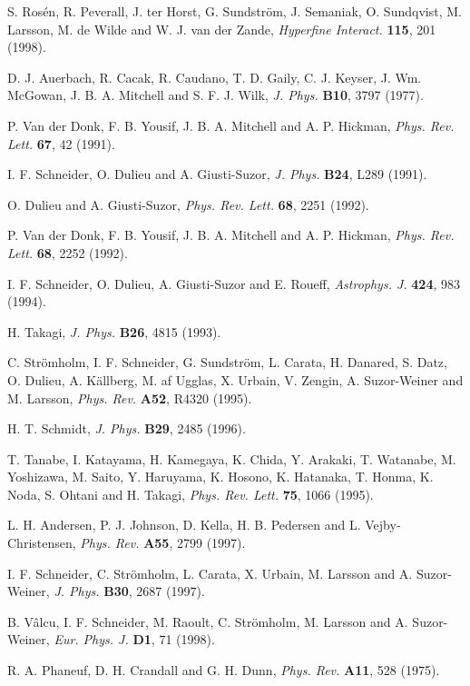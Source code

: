 \documentclass{ws-rv9x6}
\begin{document}
\begin{thebibliography}{000}
S. Ros\'en, R. Peverall, J. ter Horst,
G. Sundstr\"om, J. Semaniak, O. Sundqvist, M. Larsson, M. de Wilde and W. J. van der Zande, {\it
Hyperfine Interact.} {\bf 115}, 201 (1998).

D. J. Auerbach, R. Cacak, R. Caudano, T. D. Gaily, C. J. Keyser,
J. Wm. McGowan, J. B. A. Mitchell and S. F. J.  Wilk, {\it J. Phys.}
{\bf B10}, 3797 (1977).

P. Van der Donk, F. B. Yousif, J. B. A. Mitchell and A. P. Hickman,
{\it Phys. Rev. Lett.} {\bf 67}, 42 (1991).

I. F. Schneider, O. Dulieu and A. Giusti-Suzor, {\it J. Phys.} 
{\bf B24}, L289 (1991).

O. Dulieu and A. Giusti-Suzor, {\it Phys. Rev. Lett.}
{\bf 68}, 2251 (1992).

P. Van der Donk, F. B. Yousif, J. B. A. Mitchell and A. P. Hickman,
{\it Phys. Rev. Lett.} {\bf 68}, 2252 (1992).

I. F. Schneider, O. Dulieu, A. Giusti-Suzor and E. Roueff, {\it
Astrophys. J.} {\bf 424}, 983 (1994).

H. Takagi, {\it J. Phys.} {\bf B26}, 4815 (1993).

C. Str\"omholm, I. F. Schneider, G. Sundstr\"om, L. Carata,
H. Danared, S. Datz, O. Dulieu, A. K\"allberg, M. af Ugglas, X. Urbain, V.
Zengin, A. Suzor-Weiner and M. Larsson, {\it Phys. Rev.} {\bf A52}, R4320
(1995).

H. T. Schmidt, {\it J. Phys.} {\bf B29}, 2485 (1996).

T. Tanabe, I. Katayama, H. Kamegaya, K. Chida, Y. Arakaki,
T. Watanabe, M. Yoshizawa, M. Saito, Y. Haruyama, K. Hosono,
K. Hatanaka, T. Honma, K. Noda, S. Ohtani and H. Takagi, {\it
Phys. Rev. Lett.} {\bf 75}, 1066 (1995).

L. H. Andersen, P. J. Johnson, D. Kella, H. B. Pedersen and
L. Vejby-Christensen, {\it Phys. Rev.} {\bf A55}, 2799 (1997).

I. F. Schneider, C. Str\"omholm, L. Carata, X. Urbain, M. Larsson
and A. Suzor-Weiner, {\it J. Phys.} {\bf B30}, 2687 (1997).  

B. V\^{a}lcu, I. F. Schneider, M. Raoult, C.  Str\"omholm, M. Larsson
and A. Suzor-Weiner, {\it Eur. Phys. J.} {\bf D1}, 71 (1998).

R. A. Phaneuf, D. H. Crandall and G. H. Dunn, {\it Phys. Rev.} {\bf
A11}, 528 (1975).


\end{thebibliography}
\end{document}
